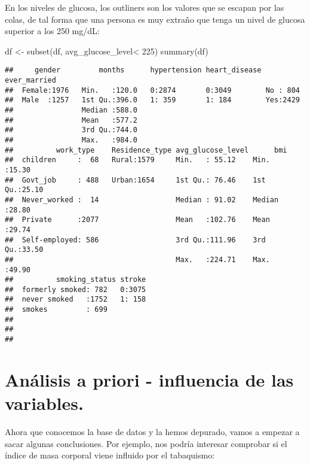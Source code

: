 \documentclass[
]{article}
\newenvironment{Shaded}{\begin{snugshade}}{\end{snugshade}}
\newcommand{\DecValTok}[1]{\textcolor[rgb]{0.00,0.00,0.81}{#1}}
\newcommand{\FunctionTok}[1]{\textcolor[rgb]{0.00,0.00,0.00}{#1}}
\newcommand{\NormalTok}[1]{#1}
\newcommand{\OtherTok}[1]{\textcolor[rgb]{0.56,0.35,0.01}{#1}}
\newcommand{\SpecialCharTok}[1]{\textcolor[rgb]{0.00,0.00,0.00}{#1}}
\begin{document}
En los niveles de glucosa, los outliners son los valores que se escapan
por las colas, de tal forma que una persona es muy extraño que tenga un
nivel de glucosa superior a los 250 mg/dL:

\begin{Shaded}
\begin{Highlighting}[]
\NormalTok{df }\OtherTok{\textless{}{-}} \FunctionTok{subset}\NormalTok{(df, avg\_glucose\_level}\SpecialCharTok{\textless{}} \DecValTok{225}\NormalTok{)}
\FunctionTok{summary}\NormalTok{(df)}
\end{Highlighting}
\end{Shaded}

\begin{verbatim}
##     gender         months      hypertension heart_disease ever_married
##  Female:1976   Min.   :120.0   0:2874       0:3049        No : 804    
##  Male  :1257   1st Qu.:396.0   1: 359       1: 184        Yes:2429    
##                Median :588.0                                          
##                Mean   :577.2                                          
##                3rd Qu.:744.0                                          
##                Max.   :984.0                                          
##          work_type    Residence_type avg_glucose_level      bmi       
##  children     :  68   Rural:1579     Min.   : 55.12    Min.   :15.30  
##  Govt_job     : 488   Urban:1654     1st Qu.: 76.46    1st Qu.:25.10  
##  Never_worked :  14                  Median : 91.02    Median :28.80  
##  Private      :2077                  Mean   :102.76    Mean   :29.74  
##  Self-employed: 586                  3rd Qu.:111.96    3rd Qu.:33.50  
##                                      Max.   :224.71    Max.   :49.90  
##          smoking_status stroke  
##  formerly smoked: 782   0:3075  
##  never smoked   :1752   1: 158  
##  smokes         : 699           
##                                 
##                                 
## 
\end{verbatim}

\hypertarget{anuxe1lisis-a-priori---influencia-de-las-variables.}{%
\section{Análisis a priori - influencia de las
variables.}\label{anuxe1lisis-a-priori---influencia-de-las-variables.}}

Ahora que conocemos la base de datos y la hemos depurado, vamos a
empezar a sacar algunas conclusiones. Por ejemplo, nos podría interesar
comprobar si el índice de masa corporal viene influido por el
tabaquismo:
\end{document}

